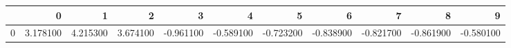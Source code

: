 \begin{tabular}{lrrrrrrrrrr}
\toprule
 & 0 & 1 & 2 & 3 & 4 & 5 & 6 & 7 & 8 & 9 \\
\midrule
0 & 3.178100 & 4.215300 & 3.674100 & -0.961100 & -0.589100 & -0.723200 & -0.838900 & -0.821700 & -0.861900 & -0.580100 \\
\bottomrule
\end{tabular}
